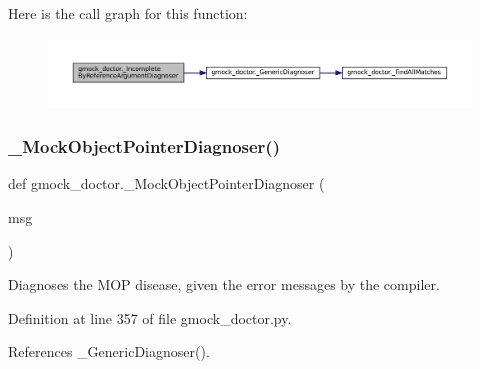 Here is the call graph for this function\+:
\nopagebreak
\begin{figure}[H]
\begin{center}
\leavevmode
\includegraphics[width=350pt]{namespacegmock__doctor_a57b4c1486c344bd12e4138c588029c19_cgraph}
\end{center}
\end{figure}
\mbox{\label{namespacegmock__doctor_a91e21533e0bc183c40f5a9873158a94b}} 
\subsubsection{\texorpdfstring{\+\_\+\+Mock\+Object\+Pointer\+Diagnoser()}{\_MockObjectPointerDiagnoser()}}
{\footnotesize\ttfamily def gmock\+\_\+doctor.\+\_\+\+Mock\+Object\+Pointer\+Diagnoser (\begin{DoxyParamCaption}\item[{}]{msg }\end{DoxyParamCaption})\hspace{0.3cm}{\ttfamily [private]}}

\begin{DoxyVerb}Diagnoses the MOP disease, given the error messages by the compiler.\end{DoxyVerb}
 

Definition at line 357 of file gmock\+\_\+doctor.\+py.



References \+\_\+\+Generic\+Diagnoser().


